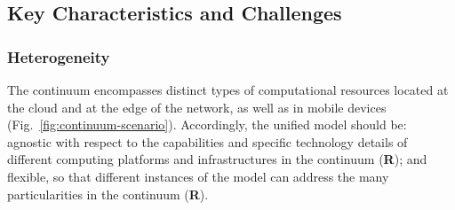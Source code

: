 \subsection{Key Characteristics and Challenges}



\subsubsection{Heterogeneity}\label{sec:heterogeneity}

The continuum encompasses distinct types of computational resources located at the cloud and at the edge of the network, as well as in mobile devices (Fig.~\ref{fig:continuum-scenario}). Accordingly, the unified model should be: agnostic with respect to the capabilities and specific technology details of different computing platforms and infrastructures in the continuum (\textbf{R}); and flexible, so that different instances of the model can address the many particularities in the continuum (\textbf{R}).




